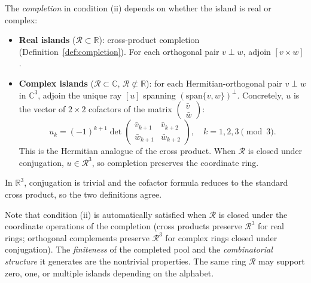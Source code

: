 \documentclass[12pt,a4paper]{article}
\newcommand{\R}{\mathbb{R}}
\newcommand{\C}{\mathbb{C}}
\begin{document}
The \emph{completion} in condition (ii) depends on whether the island is real or complex:

\begin{itemize}
    \item \textbf{Real islands} ($\mathcal{R} \subset \R$): cross-product completion (Definition~\ref{def:completion}). For each orthogonal pair $v \perp w$, adjoin $[v \times w]$.
    \item \textbf{Complex islands} ($\mathcal{R} \subset \C$, $\mathcal{R} \not\subset \R$): for each Hermitian-orthogonal pair $v \perp w$ in $\C^3$, adjoin the unique ray $[u]$ spanning $(\mathrm{span}\{v,w\})^\perp$. Concretely, $u$ is the vector of $2 \times 2$ cofactors of the matrix $\begin{pmatrix} \bar{v} \\ \bar{w} \end{pmatrix}$:
    \[
    u_k = (-1)^{k+1} \det \begin{pmatrix} \bar{v}_{k+1} & \bar{v}_{k+2} \\ \bar{w}_{k+1} & \bar{w}_{k+2} \end{pmatrix}, \quad k = 1,2,3 \pmod{3}.
    \]
    This is the Hermitian analogue of the cross product. When $\mathcal{R}$ is closed under conjugation, $u \in \mathcal{R}^3$, so completion preserves the coordinate ring.
\end{itemize}

\noindent In $\R^3$, conjugation is trivial and the cofactor formula reduces to the standard cross product, so the two definitions agree.

Note that condition (ii) is automatically satisfied when $\mathcal{R}$ is closed under the coordinate operations of the completion (cross products preserve $\mathcal{R}^3$ for real rings; orthogonal complements preserve $\mathcal{R}^3$ for complex rings closed under conjugation). The \emph{finiteness} of the completed pool and the \emph{combinatorial structure} it generates are the nontrivial properties. The same ring $\mathcal{R}$ may support zero, one, or multiple islands depending on the alphabet.
\end{document}
